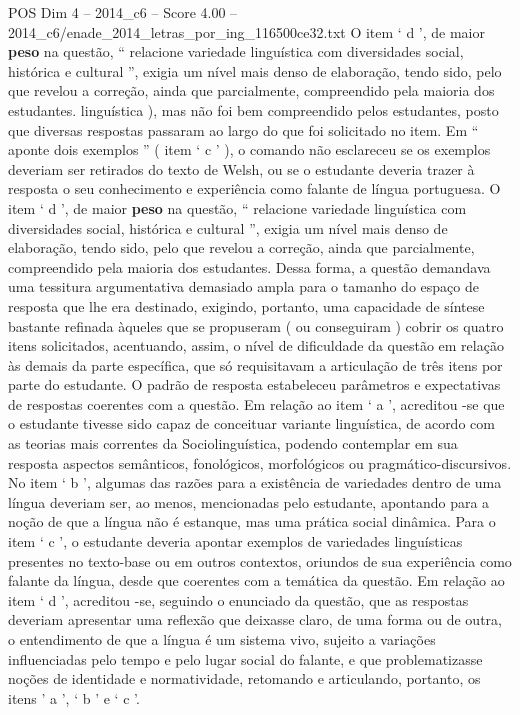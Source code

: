 \begin{textsample}{POS Dim 4 – 2014\_c6 – Score 4.00 – 2014\_c6/enade\_2014\_letras\_por\_ing\_116500ce32.txt}
O item ‘ d ’, de maior \textbf{peso} na questão, “ relacione variedade linguística com diversidades social, histórica e cultural ”, exigia um nível mais denso de elaboração, tendo sido, pelo que revelou a correção, ainda que parcialmente, compreendido pela maioria dos estudantes. linguística ), mas não foi bem compreendido pelos estudantes, posto que diversas respostas passaram ao largo do que foi solicitado no item.
Em “ aponte dois exemplos ” ( item ‘ c ’ ), o comando não esclareceu se os exemplos deveriam ser retirados do texto de Welsh, ou se o estudante deveria trazer à resposta o seu conhecimento e experiência como falante de língua portuguesa.
O item ‘ d ’, de maior \textbf{peso} na questão, “ relacione variedade linguística com diversidades social, histórica e cultural ”, exigia um nível mais denso de elaboração, tendo sido, pelo que revelou a correção, ainda que parcialmente, compreendido pela maioria dos estudantes.
Dessa forma, a questão demandava uma tessitura argumentativa demasiado ampla para o tamanho do espaço de resposta que lhe era destinado, exigindo, portanto, uma capacidade de síntese bastante refinada àqueles que se propuseram ( ou conseguiram ) cobrir os quatro itens solicitados, acentuando, assim, o nível de dificuldade da questão em relação às demais da parte específica, que só requisitavam a articulação de três itens por parte do estudante.
O padrão de resposta estabeleceu parâmetros e expectativas de respostas coerentes com a questão.
Em relação ao item ‘ a ’, acreditou -se que o estudante tivesse sido capaz de conceituar variante linguística, de acordo com as teorias mais correntes da Sociolinguística, podendo contemplar em sua resposta aspectos semânticos, fonológicos, morfológicos ou pragmático-discursivos.
No item ‘ b ’, algumas das razões para a existência de variedades dentro de uma língua deveriam ser, ao menos, mencionadas pelo estudante, apontando para a noção de que a língua não é estanque, mas uma prática social dinâmica.
Para o item ‘ c ’, o estudante deveria apontar exemplos de variedades linguísticas presentes no texto-base ou em outros contextos, oriundos de sua experiência como falante da língua, desde que coerentes com a temática da questão.
Em relação ao item ‘ d ’, acreditou -se, seguindo o enunciado da questão, que as respostas deveriam apresentar uma reflexão que deixasse claro, de uma forma ou de outra, o entendimento de que a língua é um sistema vivo, sujeito a variações influenciadas pelo tempo e pelo lugar social do falante, e que problematizasse noções de identidade e normatividade, retomando e articulando, portanto, os itens ’ a ’, ‘ b ’ e ‘ c ’.

\end{textsample}
